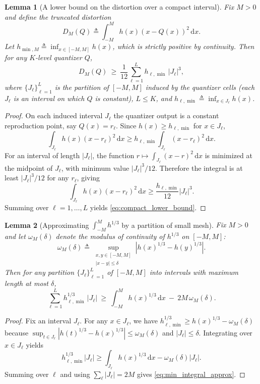 \documentclass{article}
\newtheorem{lemma}{Lemma}
\newcommand{\abs}[1]{\left\lvert #1 \right\rvert}
\newcommand{\dd}{\,\mathrm{d}}
\newcommand{\defeq}{\triangleq}
\begin{document}
\begin{lemma}[A lower bound on the distortion over a compact interval]\label{lem:compact_lower_bound}
Fix $M>0$ and define the truncated distortion
\[
D_M(Q)\defeq \int_{-M}^{M} h(x)(x-Q(x))^2\dd x.
\]
Let $h_{\min,M}\defeq \inf_{x\in[-M,M]} h(x)$, which is strictly positive by continuity.
Then for any $K$-level quantizer $Q$,
\begin{equation}\label{eq:compact_lower_bound}
D_M(Q)\ \ge\ \frac{1}{12}\sum_{\ell=1}^{L} h_{\ell,\min}\,\abs{J_\ell}^3,
\end{equation}
where $\{J_\ell\}_{\ell=1}^{L}$ is the partition of $[-M,M]$ induced by the quantizer cells (each $J_\ell$ is an interval on which $Q$ is constant), $L\le K$, and $h_{\ell,\min}\defeq \inf_{x\in J_\ell} h(x)$.
\end{lemma}
\begin{proof}
On each induced interval $J_\ell$ the quantizer output is a constant reproduction point, say $Q(x)=r_\ell$. Since $h(x)\ge h_{\ell,\min}$ for $x\in J_\ell$,
\[
\int_{J_\ell} h(x)(x-r_\ell)^2\dd x
\ge h_{\ell,\min}\int_{J_\ell}(x-r_\ell)^2\dd x.
\]
For an interval of length $\abs{J_\ell}$, the function $r\mapsto \int_{J_\ell}(x-r)^2\dd x$ is minimized at the midpoint of $J_\ell$, with minimum value $\abs{J_\ell}^3/12$. Therefore the integral is at least $\abs{J_\ell}^3/12$ for any $r_\ell$, giving
\[
\int_{J_\ell} h(x)(x-r_\ell)^2\dd x
\ge \frac{h_{\ell,\min}}{12}\abs{J_\ell}^3.
\]
Summing over $\ell=1,\dots,L$ yields \eqref{eq:compact_lower_bound}.
\end{proof}

\begin{lemma}[Approximating $\int_{-M}^{M}h^{1/3}$ by a partition of small mesh]\label{lem:min_integral_approx}
Fix $M>0$ and let $\omega_M(\delta)$ denote the modulus of continuity of $h^{1/3}$ on $[-M,M]$:
\[
\omega_M(\delta)\defeq \sup_{\substack{x,y\in[-M,M]\\|x-y|\le \delta}}\abs{h(x)^{1/3}-h(y)^{1/3}}.
\]
Then for any partition $\{J_\ell\}_{\ell=1}^{L}$ of $[-M,M]$ into intervals with maximum length at most $\delta$,
\begin{equation}\label{eq:min_integral_approx}
\sum_{\ell=1}^{L} h_{\ell,\min}^{1/3}\,\abs{J_\ell}
\ \ge\ \int_{-M}^{M} h(x)^{1/3}\dd x\ -\ 2M\,\omega_M(\delta).
\end{equation}
\end{lemma}
\begin{proof}
Fix an interval $J_\ell$. For any $x\in J_\ell$, we have $h_{\ell,\min}^{1/3}\ge h(x)^{1/3}-\omega_M(\delta)$ because $\sup_{t\in J_\ell}\abs{h(t)^{1/3}-h(x)^{1/3}}\le \omega_M(\delta)$ and $\abs{J_\ell}\le\delta$.
Integrating over $x\in J_\ell$ yields
\[
h_{\ell,\min}^{1/3}\abs{J_\ell}
\ge \int_{J_\ell} h(x)^{1/3}\dd x - \omega_M(\delta)\abs{J_\ell}.
\]
Summing over $\ell$ and using $\sum_\ell \abs{J_\ell}=2M$ gives \eqref{eq:min_integral_approx}.
\end{proof}
\end{document}

